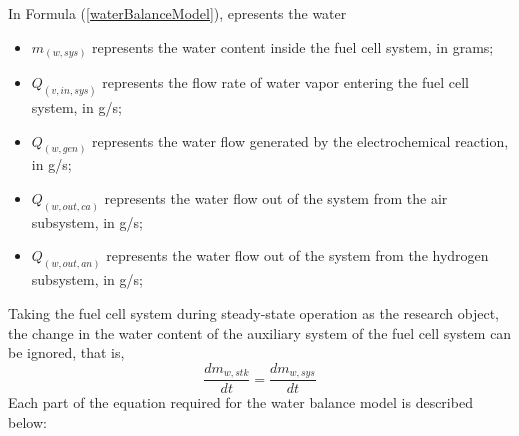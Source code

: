 In Formula (\ref{waterBalanceModel}), epresents the water
\begin{itemize}
	\item $m_(w,sys)$ represents the water content inside the fuel cell system, in grams; %
	\item $Q_(v,in,sys)$ represents the flow rate of water vapor entering the fuel cell system, in g/s; %
	\item $Q_(w,gen)$ represents the water flow generated by the electrochemical reaction, in g/s; %
	\item $Q_(w,out,ca)$ represents the water flow out of the system from the air subsystem, in g/s; %
	\item $Q_(w,out,an)$ represents the water flow out of the system from the hydrogen subsystem, in g/s; %
\end{itemize}
Taking the fuel cell system during steady-state operation as the research object, the change in the water content of the auxiliary system of the fuel cell system can be ignored, that is,
\begin{equation}\label{changeInWaterContent}
	\frac{d m_{w,s t k}}{d t}=\frac{d m_{w,s y s}}{d t}
\end{equation}
Each part of the equation required for the water balance model is described below:
